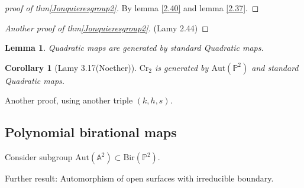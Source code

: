 \documentclass{article}
\newtheorem{lem}[defn]{Lemma}
\newtheorem{cor}[defn]{Corollary}
\begin{document}
\begin{proof}[proof of thm\ref{Jonquieresgroup2}]
  By lemma \ref{2.40} and lemma \ref{2.37}.
\end{proof}

\begin{proof}[Another proof of thm\ref{Jonquieresgroup2}]
  (Lamy 2.44)
\end{proof}


\begin{lem}
  Quadratic maps are generated by standard Quadratic maps.
\end{lem}
\begin{cor}[Lamy 3.17(Noether)]
    $ \mathrm{Cr}_2 $ is generated by $ \mathrm{Aut}(\mathbb{P}^2) $ and standard Quadratic maps.
\end{cor}

Another proof, using another triple $ (k,h,s) $.

\subsection{Polynomial birational maps}
Consider subgroup $ \mathrm{Aut}(\mathbb{A}^2)\subset \mathrm{Bir}(\mathbb{P}^2) $.


Further result: Automorphism of open surfaces with irreducible boundary.
\end{document}
